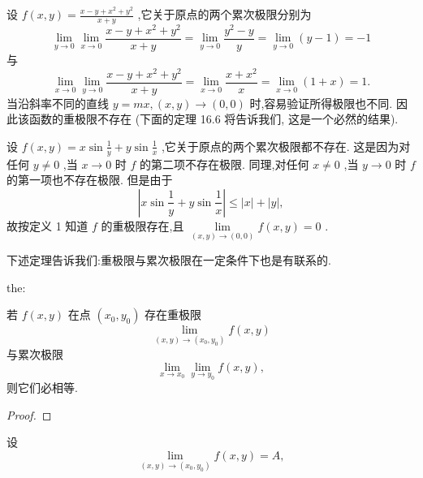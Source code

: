 \begin{example}

\end{example}
设 \(f\left( {x,y}\right)  = \frac{x - y + {x}^{2} + {y}^{2}}{x + y}\) ,它关于原点的两个累次极限分别为
\[
\mathop{\lim }\limits_{{y \rightarrow  0}}\mathop{\lim }\limits_{{x \rightarrow  0}}\frac{x - y + {x}^{2} + {y}^{2}}{x + y} = \mathop{\lim }\limits_{{y \rightarrow  0}}\frac{{y}^{2} - y}{y} = \mathop{\lim }\limits_{{y \rightarrow  0}}\left( {y - 1}\right)  =  - 1
\]
与
\[
\mathop{\lim }\limits_{{x \rightarrow  0}}\mathop{\lim }\limits_{{y \rightarrow  0}}\frac{x - y + {x}^{2} + {y}^{2}}{x + y} = \mathop{\lim }\limits_{{x \rightarrow  0}}\frac{x + {x}^{2}}{x} = \mathop{\lim }\limits_{{x \rightarrow  0}}\left( {1 + x}\right)  = 1.
\]
当沿斜率不同的直线 \(y = {mx},\left( {x,y}\right)  \rightarrow  \left( {0,0}\right)\) 时,容易验证所得极限也不同. 因此该函数的重极限不存在 (下面的定理 16.6 将告诉我们, 这是一个必然的结果).

\begin{example}

\end{example}
设 \(f\left( {x,y}\right)  = x\sin \frac{1}{y} + y\sin \frac{1}{x}\) ,它关于原点的两个累次极限都不存在. 这是因为对任何 \(y \neq  0\) ,当 \(x \rightarrow  0\) 时 \(f\) 的第二项不存在极限. 同理,对任何 \(x \neq  0\) ,当 \(y \rightarrow  0\) 时 \(f\) 的第一项也不存在极限. 但是由于
\[
\left| {x\sin \frac{1}{y} + y\sin \frac{1}{x}}\right|  \leq  \left| x\right|  + \left| y\right| ,
\]
故按定义 1 知道 \(f\) 的重极限存在,且 \(\mathop{\lim }\limits_{{\left( {x,y}\right)  \rightarrow  \left( {0,0}\right) }}f\left( {x,y}\right)  = 0\) .

下述定理告诉我们:重极限与累次极限在一定条件下也是有联系的.

\begin{theorem}{}{the:}

\end{theorem}
 若 \(f\left( {x,y}\right)\) 在点 \(\left( {{x}_{0},{y}_{0}}\right)\) 存在重极限
\[
\mathop{\lim }\limits_{{\left( {x,y}\right)  \rightarrow  \left( {{x}_{0},{y}_{0}}\right) }}f\left( {x,y}\right)
\]
与累次极限
\[
\mathop{\lim }\limits_{{x \rightarrow  {x}_{0}}}\mathop{\lim }\limits_{{y \rightarrow  {y}_{0}}}f\left( {x,y}\right) ,
\]
则它们必相等.

\begin{proof}

\end{proof}
设
\[
\mathop{\lim }\limits_{{\left( {x,y}\right)  \rightarrow  \left( {{x}_{0},{y}_{0}}\right) }}f\left( {x,y}\right)  = A,
\]


